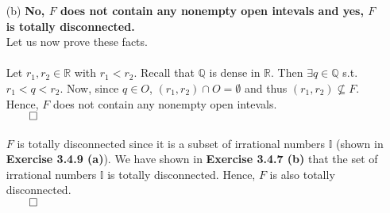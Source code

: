 \documentclass[11pt]{article}
\newcommand{\reals}{\mathbb{R}}
\newcommand{\rats}{\mathbb{Q}}
\newcommand{\irrats}{\mathbb{I}}
\begin{document}
\begin{itemize}
\begin{itemize}
            \item[(b)]
                \textbf{No, $F$ does not contain any nonempty open intevals and
                yes, $F$ is totally disconnected.}
                \\
                Let us now prove these facts.
                \\
                \\
                Let $r_1, r_2 \in \reals$ with $r_1 < r_2$. Recall that $\rats$
                is dense in $\reals$. Then $\exists q \in \rats$ s.t. $r_1 < q
                < r_2$.  Now, since $q \in O$, $(r_1, r_2) \cap O = \emptyset$
                and thus $(r_1, r_2) \not\subseteq F$. Hence, $F$ does not
                contain any nonempty open intevals.\\
                $\qed$
                \\
                \\
                $F$ is totally disconnected since it is a subset of irrational
                numbers $\irrats$ (shown in \textbf{Exercise 3.4.9 (a)}). We
                have shown in \textbf{Exercise 3.4.7 (b)} that the set of
                irrational numbers $\irrats$ is totally disconnected. Hence,
                $F$ is also totally disconnected.\\
                $\qed$
        \end{itemize}
\end{itemize}

\end{document}
